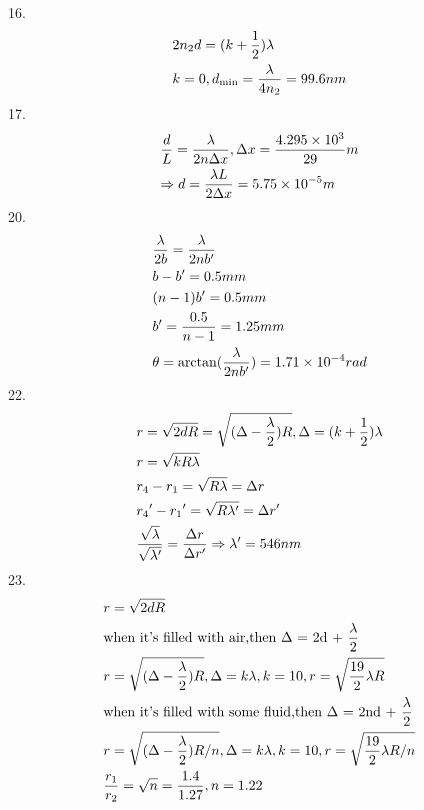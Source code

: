 \documentclass{article}
\begin{document}
16.\[\begin{gathered}
2{n_2}d = (k + \frac{1}{2})\lambda  \hfill \\
k = 0,{d_{\min }} = \frac{\lambda }{{4{n_2}}} = 99.6nm \hfill \\ 
\end{gathered} \]
17.\[\begin{gathered}
\frac{d}{L} = \frac{\lambda }{{2n\Delta x}},\Delta x = \frac{{4.295 \times {{10}^3}}}{{29}}m \hfill \\
\Rightarrow d = \frac{{\lambda L}}{{2\Delta x}} = 5.75 \times {10^{ - 5}}m \hfill \\ 
\end{gathered} \]
20.\[\begin{gathered}
\frac{\lambda }{{2b}} = \frac{\lambda }{{2nb'}} \hfill \\
b - b' = 0.5mm \hfill \\
(n - 1)b' = 0.5mm \hfill \\
b' = \frac{{0.5}}{{n - 1}} = 1.25mm \hfill \\
\theta  = \arctan (\frac{\lambda }{{2nb'}}) = 1.71 \times {10^{ - 4}}rad \hfill \\ 
\end{gathered} \]
22.\[\begin{gathered}
r = \sqrt {2dR}  = \sqrt {(\Delta  - \frac{\lambda }{2})R} ,\Delta  = (k + \frac{1}{2})\lambda  \hfill \\
r = \sqrt {kR\lambda }  \hfill \\
{r_4} - {r_1} = \sqrt {R\lambda }  = \Delta r \hfill \\
{r_4}' - {r_1}' = \sqrt {R\lambda '}  = \Delta r' \hfill \\
\frac{{\sqrt \lambda  }}{{\sqrt {\lambda '} }} = \frac{{\Delta r}}{{\Delta r'}} \Rightarrow \lambda ' = 546nm \hfill \\ 
\end{gathered} \]
23.\[\begin{gathered}
r = \sqrt {2dR}  \hfill \\
{\text{when it's filled with air,then }}\Delta {\text{ = 2d + }}\frac{\lambda }{2} \hfill \\
r = \sqrt {(\Delta  - \frac{\lambda }{2})R} ,\Delta  = k\lambda ,k = 10,r = \sqrt {\frac{{19}}{2}\lambda R}  \hfill \\
{\text{when it's filled with some fluid,then }}\Delta {\text{ = 2nd + }}\frac{\lambda }{2} \hfill \\
r = \sqrt {(\Delta  - \frac{\lambda }{2})R/n} ,\Delta  = k\lambda ,k = 10,r = \sqrt {\frac{{19}}{2}\lambda R/n}  \hfill \\
\frac{{{r_1}}}{{{r_2}}} = \sqrt n  = \frac{{1.4}}{{1.27}},n = 1.22 \hfill \\ 
\end{gathered} \]
\end{document}
